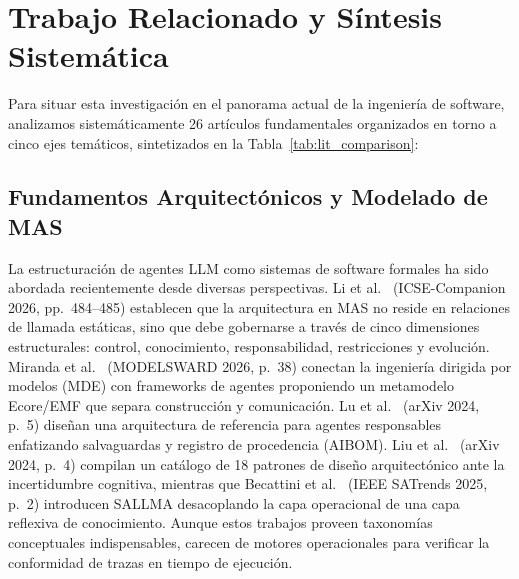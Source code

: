 \documentclass[conference]{IEEEtran}
\begin{document}
\section{Trabajo Relacionado y S\'intesis Sistem\'atica}
Para situar esta investigaci\'on en el panorama actual de la ingenier\'ia de software, analizamos sistem\'aticamente 26 art\'iculos fundamentales organizados en torno a cinco ejes tem\'aticos, sintetizados en la Tabla~\ref{tab:lit_comparison}:

\subsection{Fundamentos Arquitect\'onicos y Modelado de MAS}
La estructuraci\'on de agentes LLM como sistemas de software formales ha sido abordada recientemente desde diversas perspectivas. Li et al.~\cite{li2026} (ICSE-Companion 2026, pp.~484--485) establecen que la arquitectura en MAS no reside en relaciones de llamada est\'aticas, sino que debe gobernarse a trav\'es de cinco dimensiones estructurales: control, conocimiento, responsabilidad, restricciones y evoluci\'on. Miranda et al.~\cite{miranda2026} (MODELSWARD 2026, p.~38) conectan la ingenier\'ia dirigida por modelos (MDE) con frameworks de agentes proponiendo un metamodelo Ecore/EMF que separa construcci\'on y comunicaci\'on. Lu et al.~\cite{lu2023} (arXiv 2024, p.~5) dise\~nan una arquitectura de referencia para agentes responsables enfatizando salvaguardas y registro de procedencia (AIBOM). Liu et al.~\cite{liu2024} (arXiv 2024, p.~4) compilan un cat\'alogo de 18 patrones de dise\~no arquitect\'onico ante la incertidumbre cognitiva, mientras que Becattini et al.~\cite{becattini2025b} (IEEE SATrends 2025, p.~2) introducen SALLMA desacoplando la capa operacional de una capa reflexiva de conocimiento. Aunque estos trabajos proveen taxonom\'ias conceptuales indispensables, carecen de motores operacionales para verificar la conformidad de trazas en tiempo de ejecuci\'on.
\end{document}
